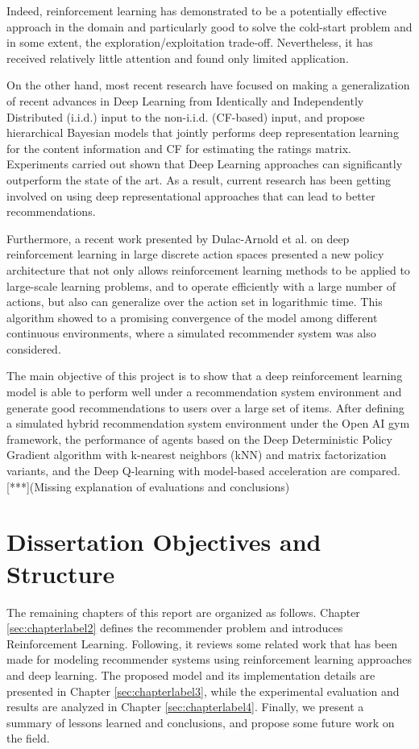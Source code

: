 Indeed, reinforcement learning has demonstrated to be a potentially effective approach in the domain and particularly good to solve the cold-start problem and in some extent, the exploration/exploitation trade-off\cite{shani2005mdp}. Nevertheless, it has received relatively little attention and found only limited application.

On the other hand, most recent research\cite{wang2015collaborative} have focused on making a generalization of recent advances in Deep Learning\cite{bengio2013representation} from Identically and Independently Distributed (i.i.d.) input to the non-i.i.d. (CF-based) input, and propose hierarchical Bayesian models that jointly performs deep representation learning for the content information and CF for estimating the ratings matrix. Experiments carried out shown that Deep Learning approaches can significantly outperform the state of the art. As a result, current research has been getting involved on using deep representational approaches that can lead to better recommendations.

Furthermore, a recent work presented by Dulac-Arnold et al. on deep reinforcement learning in large discrete action spaces\cite{Dulac-Arnold2015} presented a new policy architecture that not only allows reinforcement learning methods to be applied to large-scale learning problems, and to operate efficiently with a large number of actions, but also can generalize over the action set in logarithmic time. This algorithm showed to a promising convergence of the model among different continuous environments, where a simulated recommender system was also considered.

The main objective of this project is to show that a deep reinforcement learning model is able to perform well under a recommendation system environment and generate good recommendations to users over a large set of items. After defining a simulated hybrid recommendation system environment under the Open AI gym framework, the performance of agents based on the Deep Deterministic Policy Gradient algorithm with k-nearest neighbors (kNN) and matrix factorization variants, and the Deep Q-learning with model-based acceleration are compared. [***](Missing explanation of evaluations and conclusions)

\section{Dissertation Objectives and Structure}

The remaining chapters of this report are organized as follows. Chapter \ref{sec:chapterlabel2} defines the recommender problem and introduces Reinforcement Learning. Following, it reviews some related work that has been made for modeling recommender systems using reinforcement learning approaches and deep learning. The proposed model and its implementation details are presented in Chapter \ref{sec:chapterlabel3}, while the experimental evaluation and results are analyzed in Chapter \ref{sec:chapterlabel4}. Finally, we present a summary of lessons learned and conclusions, and propose some future work on the field.


